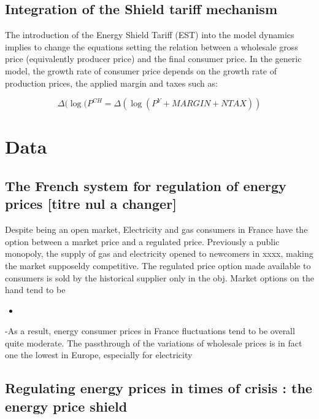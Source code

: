 \documentclass[
  letterpaper,
  DIV=11,
  numbers=noendperiod]{scrartcl}
\providecommand{\tightlist}{%
  \setlength{\itemsep}{0pt}\setlength{\parskip}{0pt}}\usepackage{longtable,booktabs,array}
\begin{document}
\hypertarget{integration-of-the-shield-tariff-mechanism}{%
\subsection{Integration of the Shield tariff
mechanism}\label{integration-of-the-shield-tariff-mechanism}}

The introduction of the Energy Shield Tariff (EST) into the model
dynamics implies to change the equations setting the relation between a
wholesale gross price (equivalently producer price) and the final
consumer price. In the generic model, the growth rate of consumer price
depends on the growth rate of production prices, the applied margin and
taxes such as:

\[ 
\Delta(\log(P^{CH} = \Delta(\log(P^Y + MARGIN + NTAX))
\]

\hypertarget{data}{%
\section{Data}\label{data}}

\hypertarget{the-french-system-for-regulation-of-energy-prices-titre-nul-a-changer}{%
\subsection{The French system for regulation of energy prices {[}titre
nul a
changer{]}}\label{the-french-system-for-regulation-of-energy-prices-titre-nul-a-changer}}

Despite being an open market, Electricity and gas consumers in France
have the option between a market price and a regulated price. Previously
a public monopoly, the supply of gas and electricity opened to newcomers
in xxxx, making the market supposeldy competitive. The regulated price
option made available to consumers is sold by the historical supplier
only in the obj. Market options on the hand tend to be

\begin{itemize}
\tightlist
\item
\end{itemize}

-As a result, energy consumer prices in France fluctuations tend to be
overall quite moderate. The passthrough of the variations of wholesale
prices is in fact one the lowest in Europe, especially for electricity

\hypertarget{regulating-energy-prices-in-times-of-crisis-the-energy-price-shield}{%
\subsection{Regulating energy prices in times of crisis : the energy
price
shield}\label{regulating-energy-prices-in-times-of-crisis-the-energy-price-shield}}
\end{document}
